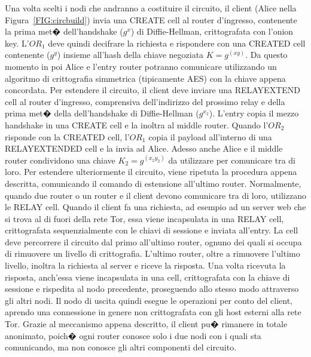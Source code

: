 Una volta scelti i nodi che andranno a costituire il circuito, il client (Alice nella Figura~\ref{FIG:circbuild}) invia una {\ttfamily CREATE} cell al router d'ingresso, contenente la prima met� dell'handshake ($g^x$) di Diffie-Hellman, crittografata con l'onion key. L'$OR_{1}$ deve quindi decifrare la richiesta e rispondere con una {\ttfamily CREATED} cell contenente ($g^y$) insieme all'hash della chiave negoziata $K=g^{(xy)}$. Da questo momento in poi Alice e l'entry router potranno comunicare utilizzando un algoritmo di crittografia simmetrica (tipicamente AES) con la chiave appena concordata. Per estendere il circuito, il client deve inviare una {\ttfamily RELAY\textunderscore EXTEND} cell al router d'ingresso, comprensiva dell'indirizzo del prossimo relay e della prima met� della dell'handshake di Diffie-Hellman ($g^{x_{2}}$). L'entry copia il mezzo handshake in una {\ttfamily CREATE} cell e la inoltra al middle router. Quando l'$OR_{2}$ risponde con la {\ttfamily CREATED} cell, l'$OR_{1}$ copia il payload all'interno di una  {\ttfamily RELAY\textunderscore EXTENDED} cell e la invia ad Alice. Adesso anche Alice e il middle router condividono una chiave $K_{2}=g^{(x_{2}y_{2})}$ da utilizzare per comunicare tra di loro. Per estendere ulteriormente il circuito, viene ripetuta la procedura appena descritta, comunicando il comando di estensione all'ultimo router. Normalmente, quando due router o un router e il client devono comunicare tra di loro, utilizzano le {\ttfamily RELAY} cell. Quando il client fa una richiesta, ad esempio ad un server web che si trova al di fuori della rete Tor, essa viene incapsulata in una {\ttfamily RELAY} cell, crittografata sequenzialmente con le chiavi di sessione e inviata all'entry. La cell deve percorrere il circuito dal primo all'ultimo router, ognuno dei quali si occupa di rimuovere un livello di crittografia. L'ultimo router, oltre a rimuovere l'ultimo livello, inoltra la richiesta al server e riceve la risposta. Una volta ricevuta la risposta, anch'essa viene incapsulata in una cell, crittografata con la chiave di sessione e rispedita al nodo precedente, proseguendo allo stesso modo attraverso gli altri nodi. Il nodo di uscita quindi esegue le operazioni per conto del client, aprendo una connessione in genere non crittografata con gli host esterni alla rete Tor. Grazie al meccanismo appena descritto, il client pu� rimanere in totale anonimato, poich� ogni router conosce solo i due nodi con i quali sta comunicando, ma non conosce gli altri componenti del circuito.
